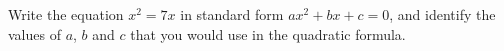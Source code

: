 Write the equation $x^2=7x$ in standard form $ax^2+bx+c=0$, and identify the values of $a$, $b$ and $c$ that you would use in the quadratic formula.
